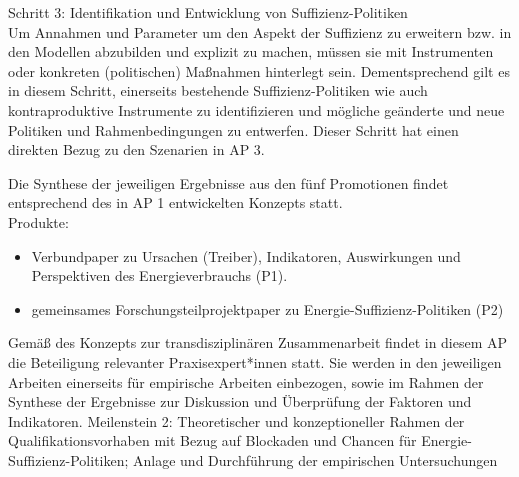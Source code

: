 \documentclass[a4paper,11pt,twoside]{scrartcl}
\begin{document}
Schritt 3: Identifikation und Entwicklung von Suffizienz-Politiken \\
Um Annahmen und Parameter um den Aspekt der Suffizienz zu erweitern bzw. in den Modellen abzubilden und explizit zu machen, müssen sie mit Instrumenten oder konkreten (politischen) Maßnahmen hinterlegt sein. Dementsprechend gilt es in diesem Schritt, einerseits bestehende Suffizienz-Politiken wie auch kontraproduktive Instrumente zu identifizieren und mögliche geänderte und neue Politiken und Rahmenbedingungen zu entwerfen. Dieser Schritt hat einen direkten Bezug zu den Szenarien in AP 3.

Die Synthese der jeweiligen Ergebnisse aus den fünf Promotionen findet entsprechend des in AP 1 entwickelten Konzepts statt.\\  
Produkte:
\begin{itemize}
    \item Verbundpaper zu Ursachen (Treiber), Indikatoren, Auswirkungen und Perspektiven des Energieverbrauchs (P1).
    \item gemeinsames Forschungsteilprojektpaper zu Energie-Suffizienz-Politiken (P2)
\end{itemize}


Gemäß des Konzepts zur transdisziplinären Zusammenarbeit findet in diesem AP die Beteiligung relevanter Praxisexpert*innen statt. Sie werden in den jeweiligen Arbeiten einerseits für empirische Arbeiten einbezogen, sowie im Rahmen der Synthese der Ergebnisse zur Diskussion und Überprüfung der Faktoren und Indikatoren.
Meilenstein 2: Theoretischer und konzeptioneller Rahmen der Qualifikationsvorhaben mit Bezug auf Blockaden und Chancen für Energie-Suffizienz-Politiken; Anlage und Durchführung der empirischen Untersuchungen
\end{document}
